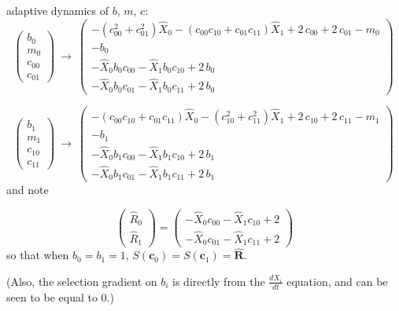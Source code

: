 \documentclass{article}
\begin{document}
adaptive dynamics of $b$, $m$, $c$:
\[\left(\begin{array}{c}
  b_{0}\\
  m_{0}\\
  c_{00}\\
  c_{01}
\end{array}\right) \
\to \
\left(\begin{array}{c}
  -{\left(c_{00}^{2} + c_{01}^{2}\right)} \hat{X}_{0} - {\left(c_{00} c_{10} + c_{01} c_{11}\right)} \hat{X}_{1} + 2 \, c_{00} + 2 \, c_{01} - m_{0}\\
  -b_{0}\\
  -\hat{X}_{0} b_{0} c_{00} - \hat{X}_{1} b_{0} c_{10} + 2 \, b_{0}\\
  -\hat{X}_{0} b_{0} c_{01} - \hat{X}_{1} b_{0} c_{11} + 2 \, b_{0}
\end{array}\right) \
\]

\[\left(\begin{array}{c}
  b_{1}\\
  m_{1}\\
  c_{10}\\
  c_{11}
\end{array}\right) \
\to \
\left(\begin{array}{c}
  -{\left(c_{00} c_{10} + c_{01} c_{11}\right)} \hat{X}_{0} - {\left(c_{10}^{2} + c_{11}^{2}\right)} \hat{X}_{1} + 2 \, c_{10} + 2 \, c_{11} - m_{1}\\
  -b_{1}\\
  -\hat{X}_{0} b_{1} c_{00} - \hat{X}_{1} b_{1} c_{10} + 2 \, b_{1}\\
  -\hat{X}_{0} b_{1} c_{01} - \hat{X}_{1} b_{1} c_{11} + 2 \, b_{1}
\end{array}\right) \
\]
and note

\[
  \left(\begin{array}{c}
  \hat{R}_{0}\\
  \hat{R}_{1}
\end{array}\right) = \left(\begin{array}{c}
  -\hat{X}_{0} c_{00} - \hat{X}_{1} c_{10} + 2\\
  -\hat{X}_{0} c_{01} - \hat{X}_{1} c_{11} + 2
\end{array}\right)
\]
so that when $b_0=b_1=1$, $S(\mathbf{c}_0)=S(\mathbf{c}_1)=\hat{\mathbf{R}}$.

(Also, the selection gradient on $b_i$ is directly from the $\frac{dX_i}{dt}$ equation, and can be seen to be equal to 0.)
\end{document}
